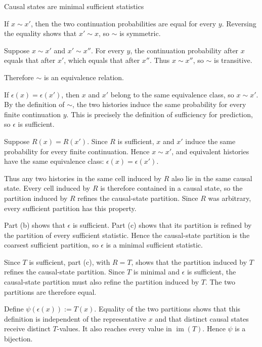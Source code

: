 \begin{exercise}[Core]{Causal states are minimal sufficient statistics}
\begin{solution}
\begin{parts}
\begin{subparts}
          \item If $x\sim x'$, then the two continuation probabilities are
            equal for every $y$. Reversing the equality shows that
            $x'\sim x$, so $\sim$ is symmetric.

          \item Suppose $x\sim x'$ and $x'\sim x''$. For every $y$, the
            continuation probability after $x$ equals that after $x'$, which
            equals that after $x''$. Thus $x\sim x''$, so $\sim$ is
            transitive.
        \end{subparts}
        Therefore $\sim$ is an equivalence relation.

      \item If $\epsilon(x)=\epsilon(x')$, then $x$ and $x'$ belong to the
        same equivalence class, so $x\sim x'$. By the definition of $\sim$,
        the two histories induce the same probability for every finite
        continuation $y$. This is precisely the definition of sufficiency for
        prediction, so $\epsilon$ is sufficient.

      \item Suppose $R(x)=R(x')$. Since $R$ is sufficient, $x$ and $x'$
        induce the same probability for every finite continuation. Hence
        $x\sim x'$, and equivalent histories have the same equivalence class:
        $\epsilon(x)=\epsilon(x')$.

        Thus any two histories in the same cell induced by $R$ also lie in the
        same causal state. Every cell induced by $R$ is therefore contained in
        a causal state, so the partition induced by $R$ refines the
        causal-state partition. Since $R$ was arbitrary, every sufficient
        partition has this property.

      \item Part (b) shows that $\epsilon$ is sufficient. Part (c) shows that
        its partition is refined by the partition of every sufficient
        statistic. Hence the causal-state partition is the coarsest sufficient
        partition, so $\epsilon$ is a minimal sufficient statistic.

      \item Since $T$ is sufficient, part (c), with $R=T$, shows that the
        partition induced by $T$ refines the causal-state partition. Since
        $T$ is minimal and $\epsilon$ is sufficient, the causal-state
        partition must also refine the partition induced by $T$. The two
        partitions are therefore equal.

        Define $\psi(\epsilon(x)):=T(x)$. Equality of the two partitions shows
        that this definition is independent of the representative $x$ and
        that distinct causal states receive distinct $T$-values. It also
        reaches every value in $\operatorname{im}(T)$. Hence $\psi$ is a
        bijection.
    \end{parts}
  \end{solution}
\end{exercise}


